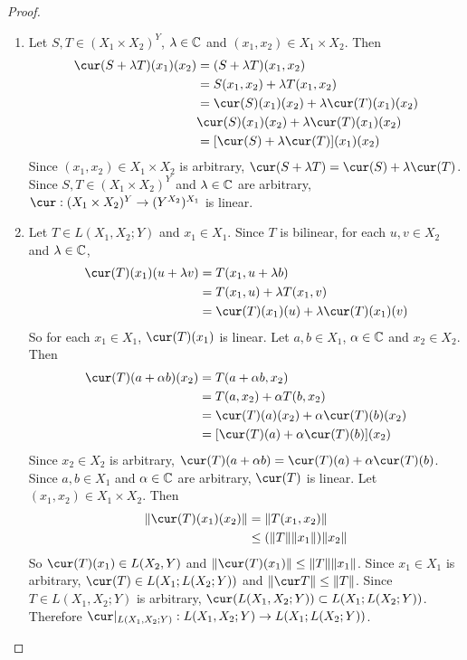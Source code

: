 \documentclass{book}
\begin{document}
	\begin{proof}\
	\begin{enumerate}
		\item Let $S, T \in (X_1 \times X_2)^Y$, $\lambda \in \mathbb{C}$ and $(x_1, x_2) \in X_1 \times X_2$. Then 
		\begin{align*}
			\cur(S + \lam T)(x_1)(x_2)
			& = (S  + \lam T)(x_1, x_2) \\
			& = S(x_1, x_2) + \lam T (x_1, x_2) \\
			& = \cur(S)(x_1)(x_2) + \lam \cur(T)(x_1)(x_2) \\
			& \cur(S)(x_1)(x_2) + \lam \cur(T)(x_1)(x_2) \\
			& = [\cur(S) + \lam \cur(T)](x_1)(x_2)
		\end{align*}
		Since $(x_1, x_2) \in X_1 \times X_2$ is arbitrary, $\cur(S + \lam T) = \cur(S) + \lam \cur(T)$. Since  $S, T \in (X_1 \times X_2)^Y$ and $\lambda \in \mathbb{C}$ are arbitrary, $\cur: (X_1 \times X_2)^Y \rightarrow  (Y^{X_2})^{X_1}$ is linear.
		\item Let $T \in L(X_1, X_2; Y)$ and $x_1 \in X_1$. Since $T$ is bilinear, for each $u,v \in X_2$ and $\lambda \in \mathbb{C}$,  
		\begin{align*}
			\cur(T)(x_1)(u + \lam v)
			& = T(x_1, u + \lam b) \\
			& = T(x_1, u) + \lam T(x_1, v) \\
			& = \cur(T)(x_1)(u) +  \lam \cur(T)(x_1)(v) \\
		\end{align*}	
		So for each $x_1 \in X_1$, $\cur(T)(x_1)$ is linear. Let $a, b \in X_1$, $\alpha \in \mathbb{C}$ and $x_2 \in X_2$. Then
		\begin{align*}
			\cur(T)(a + \al b)(x_2) 
			& = T(a + \al b, x_2) \\
			& = T(a, x_2) + \al T(b, x_2) \\
			& = \cur(T)(a)(x_2) +  \al  \cur(T)(b)(x_2) \\
			& = [\cur(T)(a) + \al \cur(T)(b)](x_2) 
		\end{align*}
		Since $x_2 \in X_2$ is arbitrary, $\cur(T)(a + \al b) = \cur(T)(a) + \al \cur(T)(b)$. Since $a,b \in X_1$ and $\alpha \in \mathbb{C}$ are arbitrary, $\cur(T)$ is linear. 
		Let $(x_1, x_2) \in X_1 \times X_2$. Then
		\begin{align*}
			\| \cur(T)(x_1)(x_2) \|
			&= \|T(x_1, x_2) \| \\
			&\leq (\|T\| \|x_1\|) \|x_2\| 
		\end{align*}
		So $\cur(T)(x_1) \in L(X_2,Y)$ and $\|\cur(T)(x_1)\| \leq \|T\|\|x_1\|$. Since $x_1 \in X_1$ is arbitrary, $\cur(T) \in  L(X_1; L(X_2;Y))$ and $\|\cur T\| \leq \|T\|$. Since $T \in L(X_1, X_2;Y)$ is arbitrary, $\cur(L(X_1, X_2; Y)) \subset L(X_1; L(X_2; Y))$. Therefore $\cur|_{L(X_1, X_2;Y)}: L(X_1, X_2;Y) \rightarrow L(X_1; L(X_2;Y))$.

\end{enumerate}
\end{proof}
\end{document}
